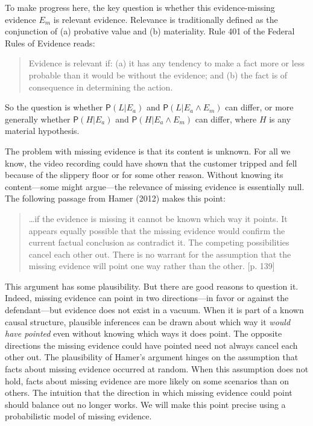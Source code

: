 \documentclass[
  10pt,
  dvipsnames,enabledeprecatedfontcommands]{scrartcl}
\newcommand{\pr}[1]{\mathsf{P}(#1)}
\begin{document}
To make progress here, the key question is whether this evidence-missing
evidence \(E_m\) is relevant evidence. Relevance is traditionally
defined as the conjunction of (a) probative value and (b) materiality.
Rule 401 of the Federal Rules of Evidence reads:

\begin{quote}
Evidence is relevant if: (a) it has any tendency to make a fact more or less probable than it would be without the evidence; and (b) the fact is of consequence in determining the action.
\end{quote}

\noindent So the question is whether \(\pr{L \vert E_a}\) and
\(\pr{L \vert E_a \wedge E_m}\) can differ, or more generally whether
\(\pr{H \vert E_a}\) and \(\pr{H \vert E_a \wedge E_m}\) can differ,
where \(H\) is any material hypothesis.

The problem with missing evidence is that its content is unknown. For
all we know, the video recording could have shown that the customer
tripped and fell because of the slippery floor or for some other reason.
Without knowing its content---some might argue---the relevance of
missing evidence is essentially null. The following passage from Hamer
(2012) makes this point:

\begin{quote}
\dots if the evidence is missing it cannot be known which way it points.
It appears equally possible that the missing evidence would confirm the current factual conclusion as contradict it. The competing possibilities cancel each other out. There is no warrant for the assumption that the missing evidence will point one way rather than the other. [p. 139]
\end{quote}

\noindent This argument has some plausibility. But there are good
reasons to question it. Indeed, missing evidence can point in two
directions---in favor or against the defendant---but evidence does not
exist in a vacuum. When it is part of a known causal structure,
plausible inferences can be drawn about which way it \emph{would have
pointed} even without knowing which ways it does point. The opposite
directions the missing evidence could have pointed need not always
cancel each other out. The plausibility of Hamer's argument hinges on
the assumption that facts about missing evidence occurred at random.
When this assumption does not hold, facts about missing evidence are
more likely on some scenarios than on others. The intuition that the
direction in which missing evidence could point should balance out no
longer works. We will make this point precise using a probabilistic
model of missing evidence.
\end{document}
